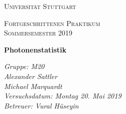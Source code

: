 \documentclass[aps,amsmath,amssymb,amsfont]{scrartcl}
\numberwithin{equation}{section}
\begin{document}
	\begin{titlepage}
	\centering
	\par\vspace{1cm}
	{\scshape\LARGE Universität Stuttgart \par}
	\vspace{1cm}
	{\scshape\Large  Fortgeschrittenen Praktikum \\ Sommersemester 2019\par}
	\vspace{1.5cm}
	{\huge\bfseries Photonenstatistik\par}
	\vspace{2cm}
	{\Large\itshape Gruppe: M20\\ Alexander Sattler  \\  Michael Marquardt    \\ Versuchsdatum: Montag 20. Mai 2019\\ Betreuer: Vural H\"useyin\\ \par}
	\end{titlepage}


\tableofcontents
\newpage





\printbibliography
\end{document}
